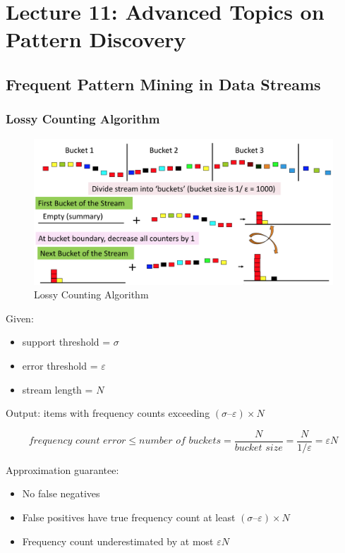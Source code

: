 \section{Lecture 11: Advanced Topics on Pattern Discovery}

\subsection{Frequent Pattern Mining in Data Streams}

\subsubsection{Lossy Counting Algorithm}
\begin{figure}[H]
    \centering
    \includegraphics[width=\linewidth]{LossyCountingAlgorithm.png}
    \caption{Lossy Counting Algorithm}
\end{figure}

\newpage
Given: 
\begin{itemize}
\item support threshold = $\sigma$
\item error threshold = $\varepsilon$
\item stream length = $N$
\end{itemize}

Output: items with frequency counts exceeding $(\sigma – \varepsilon) \times N$


\begin{equation*}
\textit{frequency count error} \leqslant \textit{number of buckets} = \frac{N}{\textit{bucket size}} = \frac{N}{1/\varepsilon} = \varepsilon N
\end{equation*}

Approximation guarantee:
\begin{itemize}
\item  No false negatives
\item  False positives have true frequency count at least $(\sigma – \varepsilon) \times N$
\item Frequency count underestimated by at most $\varepsilon N$
\end{itemize}

